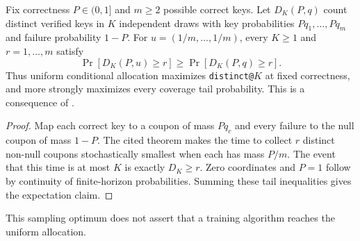 \begin{corollary}
\label{cor:coupon-uniform-coverage}
Fix correctness $P\in(0,1]$ and $m\ge2$ possible correct keys.
Let $D_K(P,q)$ count distinct verified keys in $K$ independent draws with
key probabilities $Pq_1,\ldots,Pq_m$ and failure probability $1-P$.
For $u=(1/m,\ldots,1/m)$, every $K\ge1$ and $r=1,\ldots,m$ satisfy
\begin{equation}
 \Pr[D_K(P,u)\ge r]\ge\Pr[D_K(P,q)\ge r].
 \label{eq:coupon-uniform-coverage}
\end{equation}
Thus uniform conditional allocation maximizes \texttt{distinct@}$K$ at
fixed correctness, and more strongly maximizes every coverage tail
probability. This is a consequence of
\citet[Theorem~3, v1]{anceaume2015coupon}.
\end{corollary}
\begin{proof}
Map each correct key to a coupon of mass $Pq_c$ and every failure to the
null coupon of mass $1-P$. The cited theorem makes the time to collect $r$
distinct non-null coupons stochastically smallest when each has mass $P/m$.
The event that this time is at most $K$ is exactly $D_K\ge r$.
Zero coordinates and $P=1$ follow by continuity of finite-horizon
probabilities. Summing these tail inequalities gives the expectation claim.
\end{proof}
This sampling optimum does not assert that a training algorithm reaches the
uniform allocation.
